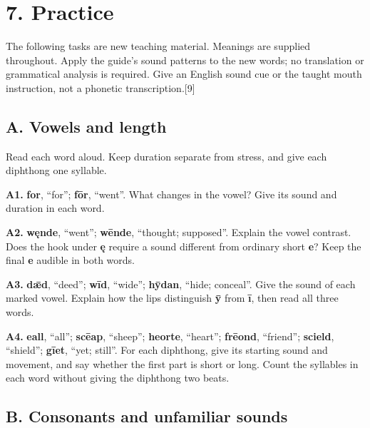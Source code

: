 \section*{7. Practice}

The following tasks are new teaching material. Meanings are supplied throughout. Apply the guide's sound patterns to the new words; no translation or grammatical analysis is required. Give an English sound cue or the taught mouth instruction, not a phonetic transcription.[9]

\subsection*{A. Vowels and length}

Read each word aloud. Keep duration separate from stress, and give each diphthong one syllable.

\textbf{A1.} \textbf{for}, “for”; \textbf{fōr}, “went”. What changes in the vowel? Give its sound and duration in each word.

\textbf{A2.} \textbf{węnde}, “went”; \textbf{wēnde}, “thought; supposed”. Explain the vowel contrast. Does the hook under \textbf{ę} require a sound different from ordinary short \textbf{e}? Keep the final \textbf{e} audible in both words.

\textbf{A3.} \textbf{dǣd}, “deed”; \textbf{wīd}, “wide”; \textbf{hȳdan}, “hide; conceal”. Give the sound of each marked vowel. Explain how the lips distinguish \textbf{ȳ} from \textbf{ī}, then read all three words.

\textbf{A4.} \textbf{eall}, “all”; \textbf{scēap}, “sheep”; \textbf{heorte}, “heart”; \textbf{frēond}, “friend”; \textbf{scield}, “shield”; \textbf{gīet}, “yet; still”. For each diphthong, give its starting sound and movement, and say whether the first part is short or long. Count the syllables in each word without giving the diphthong two beats.

\subsection*{B. Consonants and unfamiliar sounds}

